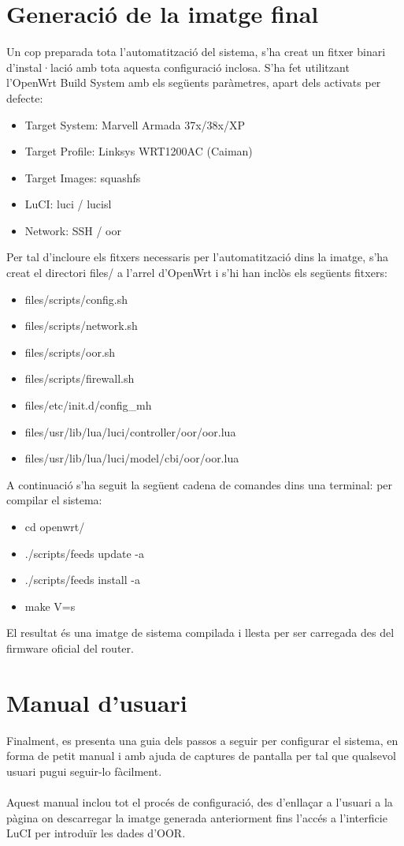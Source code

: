 \documentclass[11pt]{article}
\begin{document}
\section{Generació de la imatge final}
Un cop preparada tota l’automatització del sistema, s’ha creat un fitxer binari d’instal·lació amb tota aquesta configuració inclosa. S’ha fet utilitzant l’OpenWrt Build System amb els següents paràmetres, apart dels activats per defecte:
\begin{itemize}
\item Target System: Marvell Armada 37x/38x/XP
\item Target Profile: Linksys WRT1200AC (Caiman)
\item Target Images: squashfs
\item LuCI: luci / lucisl
\item Network: SSH / oor
\end{itemize}

Per tal d’incloure els fitxers necessaris per l’automatització dins la imatge, s’ha creat el directori files/ a l’arrel d’OpenWrt i s’hi han inclòs els següents fitxers:
\begin{itemize}
\item files/scripts/config.sh
\item files/scripts/network.sh
\item files/scripts/oor.sh
\item files/scripts/firewall.sh
\item files/etc/init.d/config\_mh
\item files/usr/lib/lua/luci/controller/oor/oor.lua
\item files/usr/lib/lua/luci/model/cbi/oor/oor.lua
\end{itemize}
A continuació s’ha seguit la següent cadena de comandes dins una terminal: per compilar el sistema:
\begin{itemize}
\item cd openwrt/
\item ./scripts/feeds update -a
\item ./scripts/feeds install -a
\item make V=s
\end{itemize}
El resultat és una imatge de sistema compilada i llesta per ser carregada des del firmware oficial del router.

\section{Manual d’usuari}
Finalment, es presenta una guia dels passos a seguir per configurar el sistema, en forma de petit manual i amb ajuda de captures de pantalla per tal que qualsevol usuari pugui seguir-lo fàcilment.\\
\\
Aquest manual inclou tot el procés de configuració, des d’enllaçar a l’usuari a la pàgina on descarregar la imatge generada anteriorment fins l’accés a l’interficie LuCI per introduïr les dades d’OOR.
\end{document}
